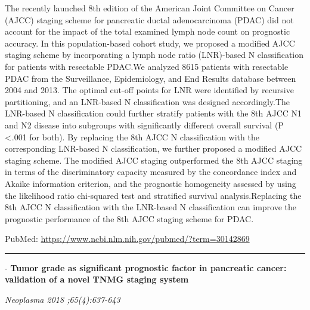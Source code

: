 \documentclass[]{article}
\begin{document}
The recently launched 8th edition of the American Joint Committee on
Cancer (AJCC) staging scheme for pancreatic ductal adenocarcinoma (PDAC)
did not account for the impact of the total examined lymph node count on
prognostic accuracy. In this population-based cohort study, we proposed
a modified AJCC staging scheme by incorporating a lymph node ratio
(LNR)-based N classification for patients with resectable PDAC.We
analyzed 8615 patients with resectable PDAC from the Surveillance,
Epidemiology, and End Results database between 2004 and 2013. The
optimal cut-off points for LNR were identified by recursive
partitioning, and an LNR-based N classification was designed
accordingly.The LNR-based N classification could further stratify
patients with the 8th AJCC N1 and N2 disease into subgroups with
significantly different overall survival (P \textless{} .001 for both).
By replacing the 8th AJCC N classification with the corresponding
LNR-based N classification, we further proposed a modified AJCC staging
scheme. The modified AJCC staging outperformed the 8th AJCC staging in
terms of the discriminatory capacity measured by the concordance index
and Akaike information criterion, and the prognostic homogeneity
assessed by using the likelihood ratio chi-squared test and stratified
survival analysis.Replacing the 8th AJCC N classification with the
LNR-based N classification can improve the prognostic performance of the
8th AJCC staging scheme for PDAC.

PubMed: \url{https://www.ncbi.nlm.nih.gov/pubmed/?term=30142869}

{}

{}

\begin{center}\rule{0.5\linewidth}{\linethickness}\end{center}

 - \textbf{Tumor grade as significant prognostic factor in pancreatic
cancer: validation of a novel TNMG staging system}

\emph{Neoplasma 2018 ;65(4):637-643}
\end{document}
